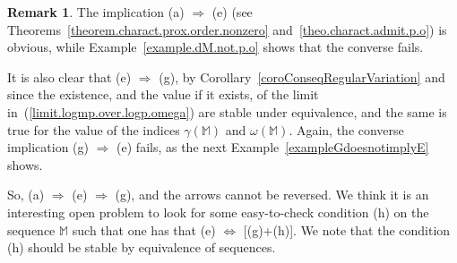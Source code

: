 \documentclass[11pt,a4paper]{article}
\theoremstyle{definition}
\newtheorem{rema}[theo]{Remark}
\def\o{\omega}
\def\ga{\gamma}
\def\M{\mathbb{M}}
\begin{document}
\begin{rema}
The implication (a) $\Rightarrow$ (e) (see Theorems~\ref{theorem.charact.prox.order.nonzero} and~\ref{theo.charact.admit.p.o}) is obvious, while Example~\ref{example.dM.not.p.o} shows that the converse fails.\par
It is also clear that (e) $\Rightarrow$ (g), by Corollary~\ref{coroConseqRegularVariation} and since the existence, and the value if it exists, of the limit in~(\ref{limit.logmp.over.logp.omega}) are stable under equivalence, and the same is true for the value of the indices $\ga(\M)$ and $\o(\M)$.
Again, the converse implication (g) $\Rightarrow$ (e) fails, as the next Example~\ref{exampleGdoesnotimplyE} shows.\par
So, (a) $\Rightarrow$ (e) $\Rightarrow$ (g), and the arrows cannot be reversed. We think it is an interesting open problem to look for some easy-to-check condition (h) on the sequence $\M$ such that one has that (e) $\Leftrightarrow$ [(g)+(h)]. We note that the condition (h) should be stable by equivalence of sequences.

\end{rema}
\end{document}
